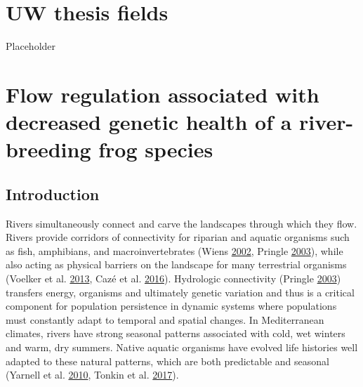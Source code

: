 \documentclass[twoside,12pt,final]{ucthesis-CA2012} %
\begin{document}
\begin{ucmainmatter}

\hypertarget{uw-thesis-fields}{%
\chapter{UW thesis fields}\label{uw-thesis-fields}}

Placeholder

\hypertarget{reg-health}{%
\chapter{Flow regulation associated with decreased genetic health of a
river-breeding frog species}\label{reg-health}}


\hypertarget{introduction}{%
\section{Introduction}\label{introduction}}

Rivers simultaneously connect and carve the landscapes through which
they flow. Rivers provide corridors of connectivity for riparian and
aquatic organisms such as fish, amphibians, and macroinvertebrates
(Wiens \protect\hyperlink{ref-wiens_riverine_2002}{2002}, Pringle
\protect\hyperlink{ref-pringle_what_2003}{2003}), while also acting as
physical barriers on the landscape for many terrestrial organisms
(Voelker et al. \protect\hyperlink{ref-voelker_river_2013}{2013}, Cazé
et al. \protect\hyperlink{ref-caze_could_2016}{2016}). Hydrologic
connectivity (Pringle \protect\hyperlink{ref-pringle_what_2003}{2003})
transfers energy, organisms and ultimately genetic variation and thus is
a critical component for population persistence in dynamic systems where
populations must constantly adapt to temporal and spatial changes. In
Mediterranean climates, rivers have strong seasonal patterns associated
with cold, wet winters and warm, dry summers. Native aquatic organisms
have evolved life histories well adapted to these natural patterns,
which are both predictable and seasonal (Yarnell et al.
\protect\hyperlink{ref-yarnell_ecology_2010}{2010}, Tonkin et al.
\protect\hyperlink{ref-tonkin_seasonality_2017}{2017}).


\end{ucmainmatter}
\end{document}
